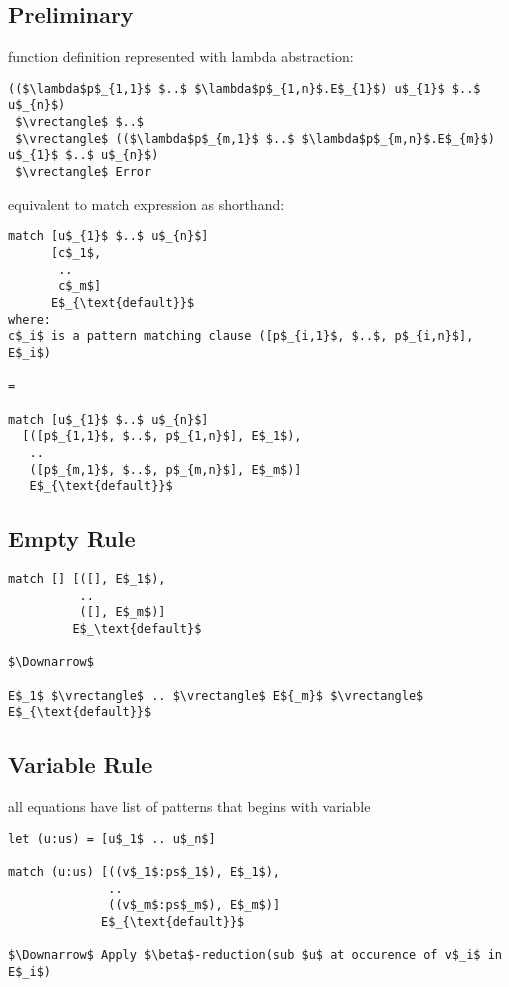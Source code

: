 \documentclass[8pt]{extarticle}
\newcommand*{\vrectangle}{{\setlength{\fboxsep}{0pt}\fbox{\phantom{l}}}}
\begin{document}
\begin{multicols*}{2}
  \subsection{Preliminary}
  
  function definition represented with lambda abstraction:

\begin{lstlisting}
(($\lambda$p$_{1,1}$ $..$ $\lambda$p$_{1,n}$.E$_{1}$) u$_{1}$ $..$ u$_{n}$)
 $\vrectangle$ $..$
 $\vrectangle$ (($\lambda$p$_{m,1}$ $..$ $\lambda$p$_{m,n}$.E$_{m}$) u$_{1}$ $..$ u$_{n}$)
 $\vrectangle$ Error
\end{lstlisting}

equivalent to match expression as shorthand:

\begin{lstlisting}
match [u$_{1}$ $..$ u$_{n}$]
      [c$_1$,
       ..
       c$_m$]
      E$_{\text{default}}$ 
where:
c$_i$ is a pattern matching clause ([p$_{i,1}$, $..$, p$_{i,n}$], E$_i$)

=

match [u$_{1}$ $..$ u$_{n}$]
  [([p$_{1,1}$, $..$, p$_{1,n}$], E$_1$),
   ..
   ([p$_{m,1}$, $..$, p$_{m,n}$], E$_m$)]
   E$_{\text{default}}$
\end{lstlisting}

\subsection{Empty Rule}
\begin{lstlisting}
match [] [([], E$_1$),
          ..
          ([], E$_m$)]
         E$_\text{default}$

$\Downarrow$
         
E$_1$ $\vrectangle$ .. $\vrectangle$ E${_m}$ $\vrectangle$ E$_{\text{default}}$
\end{lstlisting}
  
\subsection{Variable Rule}
all equations have list of patterns that begins with variable

\begin{lstlisting}
let (u:us) = [u$_1$ .. u$_n$]
  
match (u:us) [((v$_1$:ps$_1$), E$_1$),
              ..
              ((v$_m$:ps$_m$), E$_m$)]
             E$_{\text{default}}$

$\Downarrow$ Apply $\beta$-reduction(sub $u$ at occurence of v$_i$ in E$_i$)


\end{lstlisting}
\end{multicols*}
\end{document}
